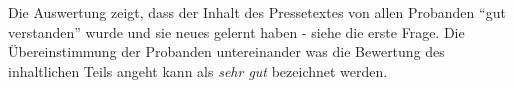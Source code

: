 Die Auswertung zeigt, dass der Inhalt des Pressetextes von allen Probanden
\enquote{gut verstanden} wurde und sie neues gelernt haben - siehe die erste Frage. 
Die Übereinstimmung der Probanden untereinander was die Bewertung des inhaltlichen 
Teils angeht kann als \emph{sehr gut} bezeichnet werden.








